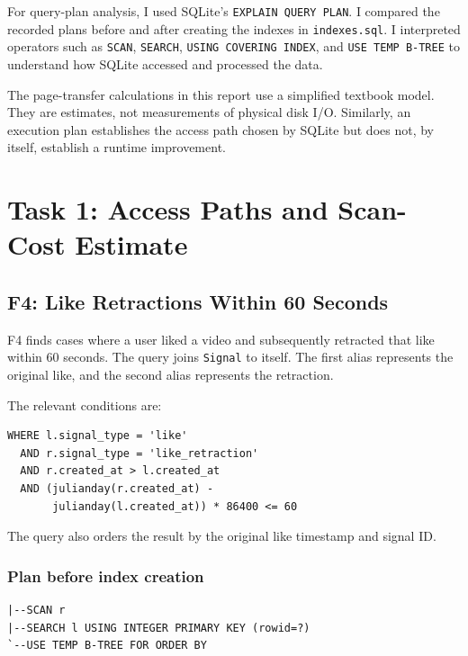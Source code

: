 \documentclass[11pt,a4paper]{article}
\begin{document}
For query-plan analysis, I used SQLite's \texttt{EXPLAIN QUERY PLAN}.
I compared the recorded plans before and after creating the indexes
in \texttt{indexes.sql}. I interpreted operators such as
\texttt{SCAN}, \texttt{SEARCH}, \texttt{USING COVERING INDEX}, and
\texttt{USE TEMP B-TREE} to understand how SQLite accessed and
processed the data.

The page-transfer calculations in this report use a simplified
textbook model. They are estimates, not measurements of physical
disk I/O. Similarly, an execution plan establishes the access path
chosen by SQLite but does not, by itself, establish a runtime
improvement.

\section{Task 1: Access Paths and Scan-Cost Estimate}

\subsection{F4: Like Retractions Within 60 Seconds}

F4 finds cases where a user liked a video and subsequently retracted
that like within 60 seconds. The query joins \texttt{Signal} to itself.
The first alias represents the original like, and the second alias
represents the retraction.

The relevant conditions are:

\begin{lstlisting}[style=sqlstyle]
WHERE l.signal_type = 'like'
  AND r.signal_type = 'like_retraction'
  AND r.created_at > l.created_at
  AND (julianday(r.created_at) -
       julianday(l.created_at)) * 86400 <= 60
\end{lstlisting}

The query also orders the result by the original like timestamp and
signal ID.

\subsubsection{Plan before index creation}

\begin{lstlisting}[style=textstyle]
|--SCAN r
|--SEARCH l USING INTEGER PRIMARY KEY (rowid=?)
`--USE TEMP B-TREE FOR ORDER BY
\end{lstlisting}
\end{document}
